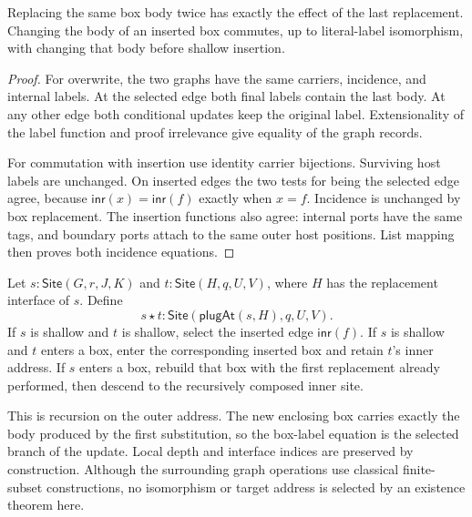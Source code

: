 \begin{lemma}
Replacing the same box body twice has exactly the effect of the last replacement.
Changing the body of an inserted box commutes, up to literal-label isomorphism,
with changing that body before shallow insertion.
\end{lemma}
\begin{proof}
For overwrite, the two graphs have the same carriers, incidence, and internal
labels. At the selected edge both final labels contain the last body. At any
other edge both conditional updates keep the original label. Extensionality of
the label function and proof irrelevance give equality of the graph records.

For commutation with insertion use identity carrier bijections. Surviving host
labels are unchanged. On inserted edges the two tests for being the selected
edge agree, because $\mathsf{inr}(x)=\mathsf{inr}(f)$ exactly when $x=f$.
Incidence is unchanged by box replacement. The insertion functions also agree:
internal ports have the same tags, and boundary ports attach to the same outer
host positions. List mapping then proves both incidence equations.
\end{proof}

\begin{definition}\label{term:composed-site}
Let $s:\mathsf{Site}(G,r,J,K)$ and $t:\mathsf{Site}(H,q,U,V)$, where $H$ has
the replacement interface of $s$. Define
\[
 s\star t:\mathsf{Site}(\mathsf{plugAt}(s,H),q,U,V).
\]
If $s$ is shallow and $t$ is shallow, select the inserted edge
$\mathsf{inr}(f)$. If $s$ is shallow and $t$ enters a box, enter the corresponding
inserted box and retain $t$'s inner address. If $s$ enters a box, rebuild that
box with the first replacement already performed, then descend to the recursively
composed inner site.
\end{definition}
This is recursion on the outer address. The new enclosing box carries exactly
the body produced by the first substitution, so the box-label equation is the
selected branch of the update. Local depth and interface indices are preserved
by construction. Although the surrounding graph operations use classical
finite-subset constructions, no isomorphism or target address is selected by
an existence theorem here.

